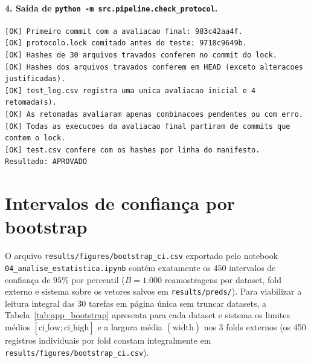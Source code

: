 \documentclass[11pt,a4paper]{article}
\begin{document}
\paragraph{4. Saída de \texttt{python -m src.pipeline.check\_protocol}.}
{\footnotesize
\begin{verbatim}
[OK] Primeiro commit com a avaliacao final: 983c42aa4f.
[OK] protocolo.lock comitado antes do teste: 9718c9649b.
[OK] Hashes de 30 arquivos travados conferem no commit do lock.
[OK] Hashes dos arquivos travados conferem em HEAD (exceto alteracoes justificadas).
[OK] test_log.csv registra uma unica avaliacao inicial e 4 retomada(s).
[OK] As retomadas avaliaram apenas combinacoes pendentes ou com erro.
[OK] Todas as execucoes da avaliacao final partiram de commits que contem o lock.
[OK] test.csv confere com os hashes por linha do manifesto.
Resultado: APROVADO
\end{verbatim}
}

\section{Intervalos de confiança por bootstrap}
\label{app:bootstrap}

O arquivo \texttt{results/figures/bootstrap\_ci.csv} exportado pelo notebook \texttt{04\_analise\_estatistica.ipynb} contém exatamente os $450$ intervalos de confiança de $95\%$ por percentil ($B = 1.000$ reamostragens por dataset, fold externo e sistema sobre os vetores salvos em \texttt{results/preds/}). Para viabilizar a leitura integral das 30 tarefas em página única sem truncar datasets, a Tabela~\ref{tab:app_bootstrap} apresenta para cada dataset e sistema os limites médios $[\overline{\mathrm{ci\_low}}; \overline{\mathrm{ci\_high}}]$ e a largura média $(\overline{\mathrm{width}})$ nos 3 folds externos (os 450 registros individuais por fold constam integralmente em \texttt{results/figures/bootstrap\_ci.csv}).
\end{document}
